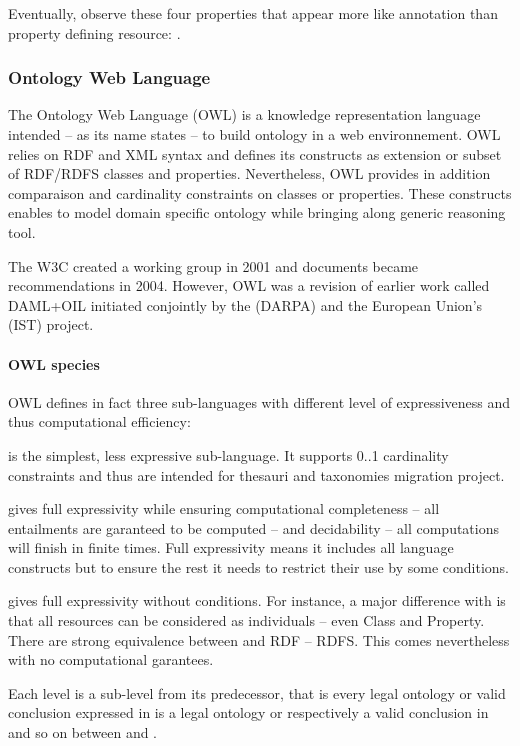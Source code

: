 Eventually, observe these four properties that appear more like annotation than property defining resource: .





\subsubsection{Ontology Web Language}
The Ontology Web Language (OWL) is a knowledge representation language intended – as its name states – to build ontology in a web environnement. 
OWL relies on RDF and XML syntax and defines its constructs as extension or subset of RDF/RDFS classes and properties. 
Nevertheless, OWL provides in addition comparaison and cardinality constraints on classes or properties. 
These constructs enables to model domain specific ontology while bringing along generic reasoning tool. 

The W3C created a working group in 2001 and documents became recommendations in 2004.
However, OWL was a revision of earlier work called DAML+OIL initiated conjointly by the  (DARPA) and the European Union's  (IST) project. 

\paragraph{OWL species}
OWL defines in fact three sub-languages with different level of expressiveness and thus computational efficiency:
\begin{liste}
	\item {} is the simplest, less expressive sub-language. 
	It supports 0..1 cardinality constraints and thus are intended for thesauri and taxonomies migration project.

	\item {} gives full expressivity while ensuring computational completeness – all entailments are garanteed to be computed – and decidability – all computations will finish in finite times. 
	Full expressivity means it includes all language constructs but to ensure the rest it needs to restrict their use by some conditions. 

	\item {} gives full expressivity without conditions. For instance, a major difference with  is that all resources can be considered as individuals – even Class and Property. 
	There are strong equivalence between  and RDF – RDFS. This comes nevertheless with no computational garantees. 
\end{liste}
Each level is a sub-level from its predecessor, that is every legal ontology or valid conclusion expressed in  is a legal ontology or respectively a valid conclusion in  and so on between  and . 

